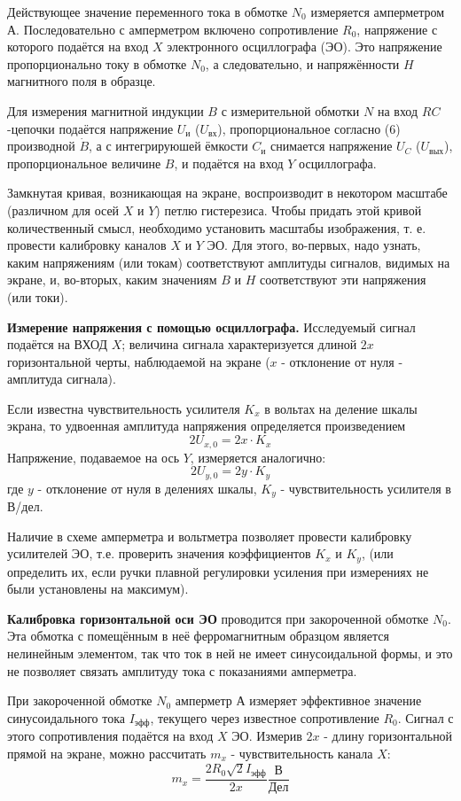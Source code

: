 \documentclass[14pt]{article}
\begin{document}
Действующее значение переменного тока в обмотке $N_0$ измеряется амперметром А. Последовательно с амперметром включено сопротивление $R_0$, напряжение с которого подаётся на вход $X$ электронного осциллографа (ЭО). Это напряжение пропорционально току в обмотке $N_0$, а следовательно, и напряжённости $H$ магнитного поля в образце.

Для измерения магнитной индукции $B$ с измерительной обмотки $N$ на вход $RC$-цепочки подаётся напряжение $U_\text{и}$ ($U_\text{вх}$), пропорциональное согласно (6) производной $\dot{B}$, а с интегрируюшей ёмкости $C_\text{и}$ снимается напряжение $U_C$ ($U_\text{вых}$), пропорциональное величине $B$, и подаётся на вход $Y$ осциллографа.

Замкнутая кривая, возникающая на экране, воспроизводит в некотором масштабе (различном для осей $X$ и $Y$) петлю гистерезиса. Чтобы придать этой кривой количественный смысл, необходимо установить масштабы изображения, т. е. провести калибровку каналов $X$ и $Y$ ЭО. Для этого, во-первых, надо узнать, каким напряжениям (или токам)
соответствуют амплитуды сигналов, видимых на экране, и, во-вторых, каким значениям $B$ и $H$ соответствуют эти напряжения (или токи).

\textbf{Измерение напряжения с помощью осциллографа.} Исследуемый сигнал подаётся на ВХОД $X$; величина сигнала характеризуется длиной $2x$ горизонтальной черты, наблюдаемой на экране ($x$ - отклонение от нуля - амплитуда сигнала).

Если известна чувствительность усилителя $K_x$ в вольтах на деление шкалы экрана, то удвоенная амплитуда напряжения определяется произведением
$$
	2U_{x,0} = 2x\cdot K_x
$$
Напряжение, подаваемое на ось $Y$, измеряется аналогично:
$$
	2U_{y,0} = 2y\cdot K_y
$$
где $y$ - отклонение от нуля в делениях шкалы, $K_y$ - чувствительность усилителя в В/дел.

Наличие в схеме амперметра и вольтметра позволяет провести калибровку усилителей ЭО, т.е. проверить значения коэффициентов $K_x$ и $K_y$, (или определить их, если ручки плавной регулировки усиления при измерениях не были установлены на максимум).

\textbf{Калибровка горизонтальной оси ЭО} проводится при закороченной обмотке $N_0$. Эта обмотка с помещённым в неё ферромагнитным образцом является нелинейным элементом, так что ток в ней не имеет синусоидальной формы, и это не позволяет связать амплитуду тока с показаниями амперметра.

При закороченной обмотке $N_0$ амперметр А измеряет эффективное значение синусоидального тока $I_\text{эфф}$, текущего через известное сопротивление $R_0$. Сигнал с этого сопротивления подаётся на вход $X$ ЭО. Измерив $2x$ - длину горизонтальной прямой на экране, можно рассчитать $m_x$ - чувствительность канала $X$:
\begin{equation}
m_x = \frac{2R_0\sqrt{2}I_\text{эфф}}{2x} \frac{\text{В}}{\text{Дел}}
\end{equation}
\end{document}
